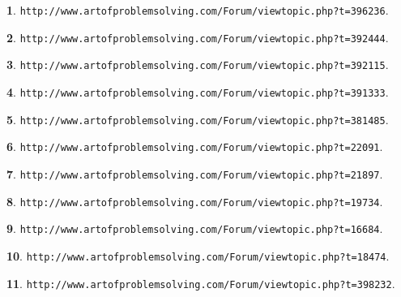 \documentclass{article}
\theoremstyle{definition}
\newtheorem{s}{}
\begin{document}
\begin{s}
\texttt{http://www.artofproblemsolving.com/Forum/viewtopic.php?t=396236}.
\end{s}




\begin{s}
\texttt{http://www.artofproblemsolving.com/Forum/viewtopic.php?t=392444}.
\end{s}




\begin{s}
\texttt{http://www.artofproblemsolving.com/Forum/viewtopic.php?t=392115}.
\end{s}




\begin{s}
\texttt{http://www.artofproblemsolving.com/Forum/viewtopic.php?t=391333}.
\end{s}




\begin{s}
\texttt{http://www.artofproblemsolving.com/Forum/viewtopic.php?t=381485}.
\end{s}




\begin{s}
\texttt{http://www.artofproblemsolving.com/Forum/viewtopic.php?t=22091}.
\end{s}




\begin{s}
\texttt{http://www.artofproblemsolving.com/Forum/viewtopic.php?t=21897}.
\end{s}




\begin{s}
\texttt{http://www.artofproblemsolving.com/Forum/viewtopic.php?t=19734}.
\end{s}




\begin{s}
\texttt{http://www.artofproblemsolving.com/Forum/viewtopic.php?t=16684}.
\end{s}




\begin{s}
\texttt{http://www.artofproblemsolving.com/Forum/viewtopic.php?t=18474}.
\end{s}




\begin{s}
\texttt{http://www.artofproblemsolving.com/Forum/viewtopic.php?t=398232}.
\end{s}
\end{document}
